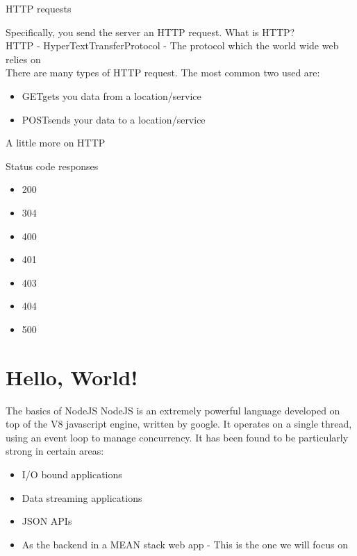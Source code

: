 \documentclass{beamer}
\begin{document}
\begin{frame}{HTTP requests}

\pause Specifically, you send the server an HTTP request. What is HTTP? \pause \\
HTTP - HyperTextTransferProtocol \pause - The protocol which the world wide web relies on \\

\pause There are many types of HTTP request. The most common two used are:
\begin{itemize}
  \item[] GET\pause \qquad gets you data from a location/service\pause
   \item[] POST\pause \qquad sends your data to a location/service
\end{itemize}

\end{frame}

\begin{frame}{A little more on HTTP}

\pause
Status code responses\pause
\begin{itemize}
  \item 200\pause
  \item 304\pause
  \item 400\pause
  \item 401\pause
  \item 403\pause
  \item 404\pause
  \item 500
  \end{itemize}

\end{frame}

\section*{Hello, World!}

\begin{frame}{The basics of NodeJS}
NodeJS is an extremely powerful language developed on top of the V8 javascript engine, written by google.
\pause
It operates on a single thread, using an event loop to manage concurrency.
\pause
It has been found to be particularly strong in certain areas:
\pause
\begin{itemize}
  \item I/O bound applications \pause
  \item Data streaming applications\pause
  \item JSON APIs\pause
  \item As the backend in a MEAN stack web app \pause - This is the one we will focus on
\end{itemize}
\end{frame}
\end{document}
